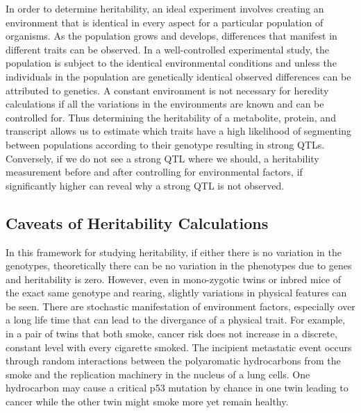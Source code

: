 \documentclass[a4paper,11pt,twoside]{book}
\begin{document}
    In order to determine heritability, an ideal experiment involves creating an environment that is identical in every aspect for a particular population of organisms. As the population grows and develops, differences that manifest in different traits can be observed. In a well-controlled experimental study, the population is subject to the identical environmental conditions and unless the individuals in the population are genetically identical observed differences can be attributed to genetics. A constant environment is not necessary for heredity calculations if all the variations in the environments are known and can be controlled for. Thus determining the heritability of a metabolite, protein, and transcript allows us to estimate which traits have a high likelihood of segmenting between populations according to their genotype resulting in strong QTLs. Conversely, if we do not see a strong QTL where we should, a heritability measurement before and after controlling for environmental factors, if significantly higher can reveal why a strong QTL is not observed.
	
\subsection*{Caveats of Heritability Calculations}
	
	In this framework for studying heritability, if either there is no variation in the genotypes, theoretically there can be no variation in the phenotypes due to genes and heritability is zero. However, even in mono-zygotic twins or inbred mice of the exact same genotype and rearing, slightly variations in physical features can be seen. There are stochastic manifestation of environment factors, especially over a long life time that can lead to the divergance of a physical trait\citep{Czyz2012Geneticdifferences}. For example, in a pair of twins that both smoke, cancer risk does not increase in a discrete, constant level with every cigarette smoked. The incipient metastatic event occurs through random interactions between the polyaromatic hydrocarbons from the smoke and the replication machinery in the nucleus of a lung cells. One hydrocarbon may cause a critical p53 mutation by chance in one twin leading to cancer while the other twin might smoke more yet remain healthy.
	
\end{document}
